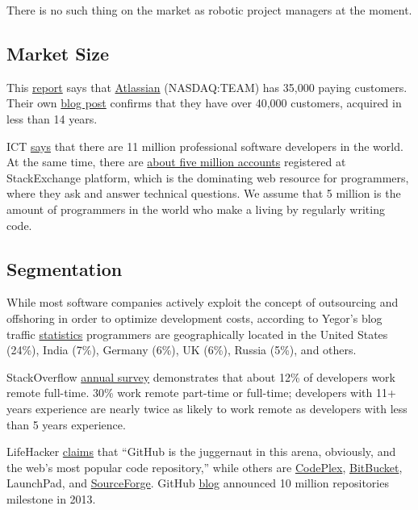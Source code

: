 \documentclass[12pt]{article}
\begin{document}
There is no such thing on the market as robotic project managers at the moment.

\subsection{Market Size}

This \href{www.capterra.com/project-management-software/#infographic}{report}
says that \href{https://www.atlassian.com/}{Atlassian}
(NASDAQ:TEAM) has 35,000 paying customers. Their
own \href{https://blogs.atlassian.com/2014/11/atlassian-customers-thank-you/}{blog post}
confirms that they have over 40,000 customers, acquired in less
than 14 years.

ICT \href{https://www.infoq.com/news/2014/01/IDC-software-developers}{says}
that there are 11 million professional software developers in the
world. At the same time, there are \href{https://sostats.github.io/}{about five million accounts} registered at
StackExchange platform, which is the dominating web resource for programmers,
where they ask and answer technical questions. We assume that 5 million is the
amount of programmers in the world who make a living by regularly writing code.

\subsection{Segmentation}

While most software companies actively exploit the concept of outsourcing and
offshoring in order to optimize development costs, according to Yegor's blog
traffic \href{https://twitter.com/yegor256/status/770780702711226369}{statistics}
programmers are geographically located in the United States
(24\%), India (7\%), Germany (6\%), UK (6\%), Russia (5\%), and others.

StackOverflow \href{https://stackoverflow.com/research/developer-survey-2016}{annual survey}
demonstrates that about 12\% of developers  work
remote full-time. 30\% work remote part-time or full-time; developers with 11+
years experience are nearly twice as likely to work remote as developers with
less than 5 years experience.

LifeHacker \href{https://lifehacker.com/the-best-alternatives-to-google-code-for-your-programmi-1691688947}{claims}
that ``GitHub is the juggernaut in this arena, obviously, and
the web's most popular code repository,'' while others are
\href{https://www.codeplex.com/}{CodePlex},
\href{https://bitbucket.org/}{BitBucket},
LaunchPad, and
\href{https://sourceforge.net/}{SourceForge}.
GitHub \href{https://github.com/blog/1724-10-million-repositories}{blog} announced 10 million repositories
milestone in 2013.
\end{document}
